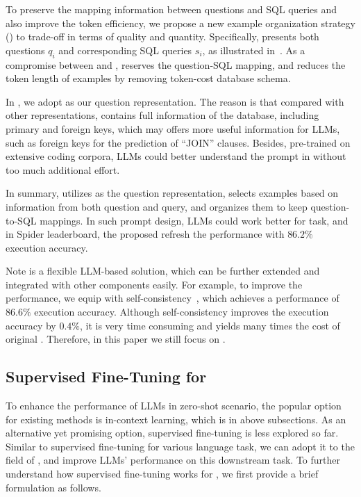 To preserve the mapping information between questions and SQL queries and also improve the token efficiency, we propose a new example organization strategy \textbf{\pairorg} (\abpairorg) to trade-off in terms of quality and quantity.
Specifically, \abpairorg presents both questions $q_i$ and corresponding SQL queries $s_i$, as illustrated in~. As a compromise between \abfiorg and \absqlorg, \abpairorg reserves the question-SQL mapping, and reduces the token length of examples by removing token-cost database schema.

In \ours, we adopt \absqlprompt as our question representation.
The reason is that compared with other representations, \absqlprompt contains full information of the database, including primary and foreign keys, which may offers more useful information for LLMs, such as foreign keys for the prediction of ``JOIN'' clauses. 
Besides, pre-trained on extensive coding corpora, LLMs could better understand the prompt in \absqlprompt without too much additional effort. 

In summary, \ours utilizes \absqlprompt as the question representation, selects examples based on information from both question and query, and organizes them to keep question-to-SQL mappings. In such prompt design, LLMs could work better for \nlsql task, and in Spider leaderboard, the proposed \ours refresh the performance with $86.2\%$ execution accuracy.

Note \ours is a flexible LLM-based \nlsql solution, which can be further extended and integrated with other components easily. 
For example, to improve the performance, we equip \ours with self-consistency~\cite{DBLP:conf/iclr/0002WSLCNCZ23}, which achieves a performance of $86.6\%$ execution accuracy. 
Although self-consistency improves the execution accuracy by $0.4\%$, it is very time consuming and yields many times the cost of original \ours. 
Therefore, in this paper we still focus on \ours. 

\subsection{Supervised Fine-Tuning for \nlsql}
To enhance the performance of LLMs in zero-shot scenario, the popular option for existing \nlsql methods is in-context learning, which is  in above subsections. As an alternative yet promising option, supervised fine-tuning is less explored so far.  
Similar to supervised fine-tuning for various language task, we can adopt it to the field of \nlsql, and improve LLMs' performance on this downstream task. 
To further understand how supervised fine-tuning works for \nlsql, we first provide a brief formulation as follows.

